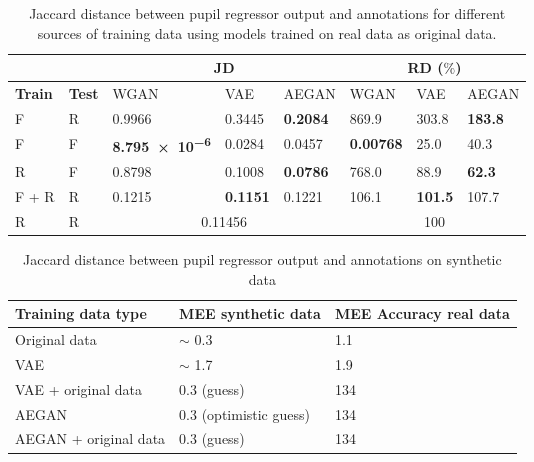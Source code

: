 \begin{table}[t]
    \centering
    \caption{Jaccard distance between pupil regressor output and annotations for different sources of training data using models trained on real data as original data.}
    \label{tab:quantitative_results_real}
    \begin{tabular}{|ll|lll|lll|}
        \cline{3-8}
        \multicolumn{2}{c}{ } & \multicolumn{3}{|c|}{JD} & \multicolumn{3}{c|}{RD ($\%$)} \\ \hline
        \textbf{Train} & \textbf{Test} & WGAN & VAE & AEGAN & WGAN & VAE & AEGAN \\ \hline
        F & R & \num{0.9966} & \num{0.3445} & \textbf{\num{0.2084}} & \num{869.9} & \num{303.8} & \textbf{\num{183.8}} \\
        F & F & \textbf{\num{8.795e-6}} & \num{0.0284} & \num{0.0457} & \textbf{\num{0.00768}} & \num{25.0} & \num{40.3} \\ 
        R & F & \num{0.8798} & \num{0.1008} & \textbf{\num{0.0786}} & \num{768.0} & \num{88.9} & \textbf{\num{62.3}} \\ 
        F + R & R & \num{0.1215} & \textbf{\num{0.1151}} & \num{0.1221} & \num{106.1} & \textbf{\num{101.5}} & \num{107.7} \\ 
        \hline
        R & R & \multicolumn{3}{c|}{\num{0.11456}} & \multicolumn{3}{c|}{100} \\
        \hline
    \end{tabular}
\end{table}

\begin{table}[t]
    \centering
    \caption{Jaccard distance between pupil regressor output and annotations on synthetic data}
    \label{tab:quantitative_results}
    \begin{tabular}{l|l|l}
    \hline
    Training data type      & MEE synthetic data  & MEE Accuracy real data \\ \hline
    Original data           & $\sim$ 0.3 & 1.1     \\
    VAE                     & $\sim$ 1.7 & 1.9     \\
    VAE + original data     & 0.3 (guess) & 134     \\
    AEGAN                   & 0.3 (optimistic guess) & 134     \\
    AEGAN + original data   & 0.3 (guess) & 134     \\
    \end{tabular}
\end{table}



